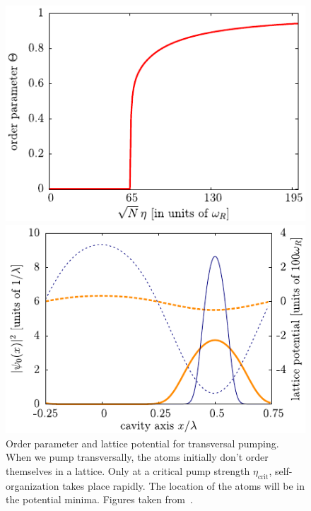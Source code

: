 \begin{figure}[!htb]
	\begin{minipage}[b]{.5\linewidth}
	\centering
	\includegraphics[width=1\linewidth]{images/order-parameter.pdf}
	\end{minipage}
%
	\begin{minipage}[b]{.5\linewidth}
	\centering
	\includegraphics[width=1\linewidth]{images/lattice-potential.pdf}
	\end{minipage}
\caption{Order parameter and lattice potential for transversal pumping. When we pump transversally, the atoms initially don't order themselves in a lattice. Only at a critical pump strength $\eta_\text{crit}$, self-organization takes place rapidly. The location of the atoms will be in the potential minima. Figures taken from~\cite{Nagy2008}.}
\label{fig:self-organization}
\end{figure}
\FloatBarrier